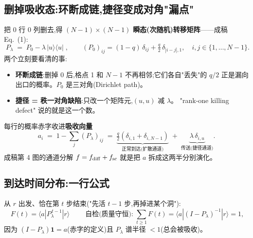 \documentclass[11pt]{article}
\newcommand{\ket}[1]{|#1\rangle}
\newcommand{\bra}[1]{\langle#1|}
\begin{document}
\begin{center}
\end{center}

\subsection{删掉吸收态:环断成链,捷径变成对角"漏点"}
把 0 行 0 列删去,得 $(N-1)\times(N-1)$ \textbf{瞬态(次随机)转移矩阵}——成稿 Eq.~(1):
\[
\boxed{\;P_\lambda \;=\; P_0-\lambda\,\ket{u}\!\bra{u}\;},\qquad
(P_0)_{ij}=(1-q)\,\delta_{ij}+\tfrac q2\,\delta_{|i-j|,1},\quad i,j\in\{1,\dots,N-1\}.
\]
两个立刻要看清的事:
\begin{itemize}
\item \textbf{环断成链}:删掉 0 后,格点 1 和 $N-1$ 不再相邻;它们各自"丢失"的 $q/2$
  正是漏向出口的概率。$P_0$ 是三对角(Dirichlet path)。
\item \textbf{捷径 = 秩一对角缺陷}:只改一个矩阵元,$(u,u)$ 减 $\lambda$。
  "rank-one killing defect" 说的就是这一个数。
\end{itemize}
每行的概率赤字收进\textbf{吸收向量}
\[
a_i \;=\; 1-\textstyle\sum_j (P_\lambda)_{ij}
      \;=\; \underbrace{\tfrac q2(\delta_{i,1}+\delta_{i,N-1})}_{\text{正常到达(扩散通道)}}
       \;+\; \underbrace{\lambda\,\delta_{i,u}}_{\text{传送(捷径通道)}} .
\]
成稿第 4 图的通道分解 $f=f_{\rm diff}+f_{\rm sc}$ 就是把 $a$ 拆成这两半分别演化。

\subsection{到达时间分布:一行公式}
从 $r$ 出发、恰在第 $t$ 步结束("先活 $t-1$ 步,再掉进某个洞"):
\[
\boxed{\;F(t)=\bra{a}P_\lambda^{\,t-1}\ket{r}\;}
\qquad\text{自检(质量守恒):}\;
\sum_{t\ge1}F(t)=\bra{a}(I-P_\lambda)^{-1}\ket{r}=1,
\]
因为 $(I-P_\lambda)\bm 1=a$(赤字的定义)且 $P_\lambda$ 谱半径 $<1$(总会被吸收)。
\end{document}
